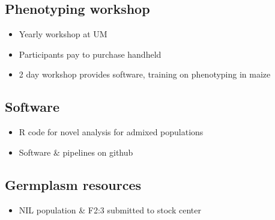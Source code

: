 \subsection{Phenotyping workshop} %
\begin{itemize}
\item Yearly workshop at UM
\item Participants pay to purchase handheld
\item 2 day workshop provides software, training on phenotyping in maize
\end{itemize}

\subsection{Software} %
\begin{itemize}
\item R code for novel analysis for admixed populations
\item Software \& pipelines on github
\end{itemize}

\subsection{Germplasm resources} %
\begin{itemize}
\item NIL population \& F2:3 submitted to stock center
\end{itemize}





